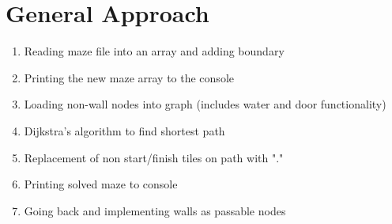 \documentclass[11pt]{report}
\begin{document}
\section*{General Approach}
\begin{enumerate}
\item Reading maze file into an array and adding boundary
\item Printing the new maze array to the console
\item Loading non-wall nodes into graph (includes water and door functionality)
\item Dijkstra's algorithm to find shortest path
\item Replacement of non start/finish tiles on path with "."
\item Printing solved maze to console
\item Going back and implementing walls as passable nodes
\end{enumerate}
\end{document}

